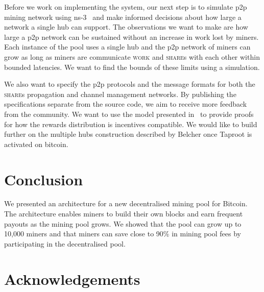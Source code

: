 \documentclass{article}
\begin{document}
Before we work on implementing the system, our next step is to
simulate p2p mining network using ns-3~\cite{ns3} and make informed
decisions about how large a network a single hub can support. The
observations we want to make are how large a p2p network can be
sustained without an increase in work lost by miners. Each instance of
the pool uses a single hub and the p2p network of miners can grow as
long as miners are communicate \textsc{work} and \textsc{share}s with
each other within bounded latencies. We want to find the bounds of
these limits using a simulation.

We also want to specify the p2p protocols and the message formats for
both the \textsc{share}s propagation and channel management
networks. By publishing the specifications separate from the source
code, we aim to receive more feedback from the community. We want to
use the model presented in~\cite{incentives-compatible} to provide
proofs for how the rewards distribution is incentives compatible. We
would like to build further on the multiple hubs construction
described by Belcher once Taproot is activated on bitcoin.

\section{Conclusion}

We presented an architecture for a new decentralised mining pool for
Bitcoin. The architecture enables miners to build their own blocks and
earn frequent payouts as the mining pool grows. We showed that the
pool can grow up to 10,000 miners and that miners can save close to
90\% in mining pool fees by participating in the decentralised pool.

\section{Acknowledgements}


 

\end{document}
